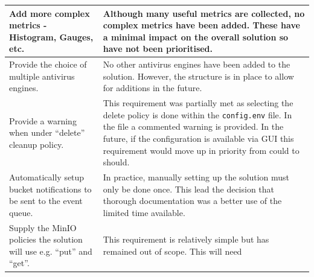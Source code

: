\documentclass[12pt, conference, final, a4paper, onecolumn, compsoc]{IEEEtran}
\begin{document}
\begin{table}[H]
\begin{tabular}{|p{}|p{}|}
    Add more complex metrics - Histogram, Gauges, etc. & Although many useful
                                                        metrics are collected,
                                                        no complex metrics have
                                                        been added. These have a
    minimal impact on the overall solution so have not been prioritised. \\ \hline \hline
    Provide the choice of multiple antivirus engines. & No other antivirus
                                                       engines have been added
                                                       to the solution. However,
    the structure is in place to allow for additions in the future.\\ \hline
    Provide a warning when under ``delete'' cleanup policy. & This requirement
                                                              was partially met
                                                              as selecting the
                                                              delete policy is
                                                              done within the
                                                              \texttt{config.env}
    file. In the file a commented warning is provided. In the future, if the
                                                              configuration is
                                                              available via GUI
                                                              this requirement
                                                              would move up in
                                                              priority from
                                                              could to should. \\ \hline
    Automatically setup bucket notifications to be sent to the event queue. & In
    practice, manually setting up the solution must only be done once. This lead
    the decision that thorough documentation was a better use of the limited
                                                                              time
                                                                              available.
    \\ \hline
    Supply the MinIO policies the solution will use e.g. ``put'' and ``get''. &
   This requirement is relatively simple but has remained out of scope. This
                                                                                will
                                                                                need

\end{tabular}
\end{table}
\end{document}
